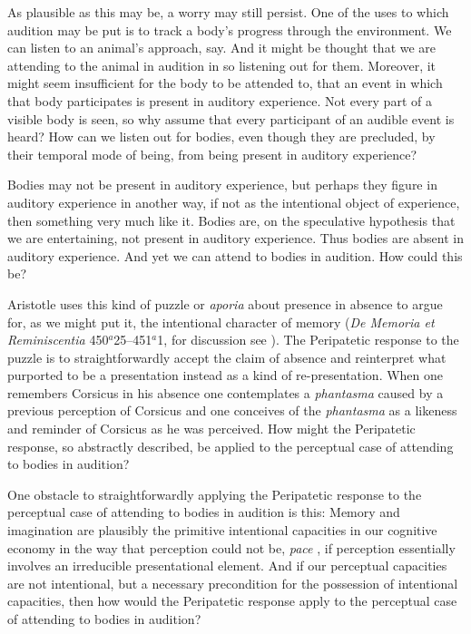 As plausible as this may be, a worry may still persist. One of the uses to which audition may be put is to track a body's progress through the environment. We can listen to an animal's approach, say. And it might be thought that we are attending to the animal in audition in so listening out for them. Moreover, it might seem insufficient for the body to be attended to, that an event in which that body participates is present in auditory experience. Not every part of a visible body is seen, so why assume that every participant of an audible event is heard? How can we listen out for bodies, even though they are precluded, by their temporal mode of being, from being present in auditory experience? 

Bodies may not be present in auditory experience, but perhaps they figure in auditory experience in another way, if not as the intentional object of experience, then something very much like it. Bodies are, on the speculative hypothesis that we are entertaining, not present in auditory experience. Thus bodies are absent in auditory experience. And yet we can attend to bodies in audition. How could this be? 

Aristotle uses this kind of puzzle or \emph{aporia} about presence in absence to argue for, as we might put it, the intentional character of memory (\emph{De Memoria et Reminiscentia} 450\( ^{a} \)25--451\( ^{a} \)1, for discussion see \citealt{Sorabji:2004qa}). The Peripatetic response to the puzzle is to straightforwardly accept the claim of absence and reinterpret what purported to be a presentation instead as a kind of re-presentation. When one remembers Corsicus in his absence one contemplates a \emph{phantasma} caused by a previous perception of Corsicus and one conceives of the \emph{phantasma} as a likeness and reminder of Corsicus as he was perceived. How might the Peripatetic response, so abstractly described, be applied to the perceptual case of attending to bodies in audition? 

One obstacle to straightforwardly applying the Peripatetic response to the perceptual case of attending to bodies in audition is this: Memory and imagination are plausibly the primitive intentional capacities in our cognitive economy in the way that perception could not be, \emph{pace} \citet{Burge:2010uq}, if perception essentially involves an irreducible presentational element. And if our perceptual capacities are not intentional, but a necessary precondition for the possession of intentional capacities, then how would the Peripatetic response apply to the perceptual case of attending to bodies in audition?

